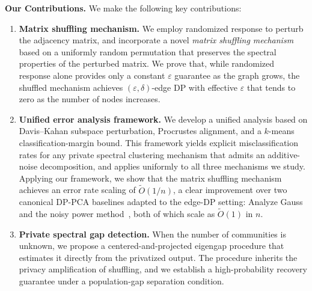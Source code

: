 \documentclass[11pt]{article}
\theoremstyle{plain}
\theoremstyle{definition}
\theoremstyle{remark}
\begin{document}
\textbf{Our Contributions.} We make the following key contributions:
\begin{enumerate}[leftmargin=*, itemsep=2pt, topsep=2pt]

\item \textbf{Matrix shuffling mechanism.} We employ randomized response to perturb the adjacency matrix, and incorporate a novel \emph{matrix shuffling mechanism} based on a uniformly random permutation that preserves the spectral properties of the perturbed matrix. We prove that, while randomized response alone provides only a constant $\varepsilon$ guarantee as the graph grows, the shuffled mechanism achieves $(\varepsilon, \delta)$-edge DP with effective $\varepsilon$ that tends to zero as the number of nodes increases.

\item \textbf{Unified error analysis framework.} We develop a unified analysis based on Davis--Kahan subspace perturbation, Procrustes alignment, and a $k$-means classification-margin bound. This framework yields explicit misclassification rates for any private spectral clustering mechanism that admits an additive-noise decomposition, and applies uniformly to all three mechanisms we study. Applying our framework, we show that the matrix shuffling mechanism achieves an error rate scaling of $\tilde{O}(1/n)$, a clear improvement over two canonical DP-PCA baselines adapted to the edge-DP setting: Analyze Gauss~\citep{dwork2014analyze} and the noisy power method~\citep{hardt2014noisy}, both of which scale as $\tilde{O}(1)$ in $n$.



\item \textbf{Private spectral gap detection.} When the number of communities is unknown, we propose a centered-and-projected eigengap procedure that estimates it directly from the privatized output. The procedure inherits the privacy amplification of shuffling, and we establish a high-probability recovery guarantee under a population-gap separation condition.


\end{enumerate}
\end{document}
